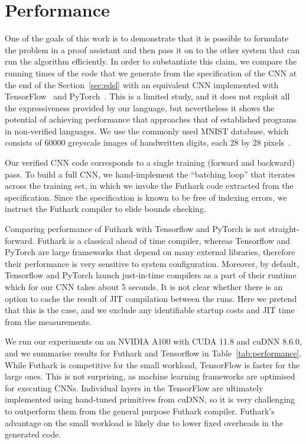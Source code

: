 \section{Performance\label{sec:performance}}

One of the goals of this work is to demonstrate that it is possible to
formulate the problem in a proof assistant and then pass it on to the
other system that can run the algorithm efficiently. In order to
substantiate this claim, we compare the running times of the code that
we generate from the specification of the CNN at the end of the
Section~\ref{sec:edsl} with an equivalent CNN implemented with
TensorFlow~\cite{ad-tf} and PyTorch~\cite{ad-pytorch}. This is a
limited study, and it does not exploit all the expressiveness provided
by our language, but nevertheless it shows the potential of achieving
performance that approaches that of established programs in
non-verified languages. We use the commonly used MNIST database, which
consists of 60000 greyscale images of handwritten digits, each 28 by
28 pixels~\cite{deng2012mnist}.

Our verified CNN code corresponds to a single training (forward and
backward) pass. To build a full CNN, we hand-implement the
``batching loop'' that iterates across the training set, in which we
invoke the Futhark code extracted from the specification. Since the
specification is known to be free of indexing errors, we instruct the
Futhark compiler to elide bounds checking.


Comparing performance of Futhark with Tensorflow and PyTorch is not
straight-forward.  Futhark is a classical ahead of time compiler,
whereas Tensorflow and PyTorch are large frameworks that depend on
many external libraries, therefore their performance is very
sensitive to system configuration.  Moreover, by default, Tensorflow
and PyTorch launch just-in-time compilers as a part of their runtime
which for our CNN takes about 5 seconds.
It is not clear whether there is an option to cache the result of
JIT compilation between the runs.  Here we pretend that this is the
case, and we exclude any identifiable startup costs and JIT time
from the measurements.

We run our experiments on an NVIDIA A100 with
CUDA 11.8 and cuDNN 8.6.0, and we summarise results for Futhark and
Tensorflow in Table~\ref{tab:performance}. 
While Futhark is competitive for the small workload, TensorFlow is
faster for the large ones. This is not surprising, as machine learning
frameworks are optimised for executing CNNs.  Individual
layers in the TensorFlow are ultimately implemented
using hand-tuned primitives from cuDNN, so it is very challenging
to outperform them from the general purpose Futhark compiler.
Futhark's advantage on the small workload is likely due to lower
fixed overheads in the generated code.

